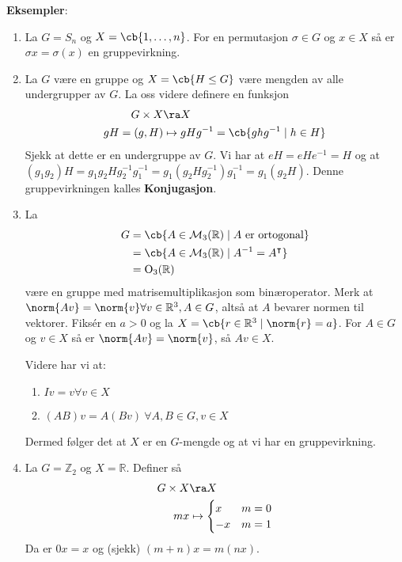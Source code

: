 \textbf{Eksempler}:
\begin{enumerate}
	\item La $G = S_n$ og $X = \cb{1, \dots, n}$. For en permutasjon $\sigma \in G$ og
	      $x\in X$ så er $\sigma x = \sigma(x)$ en gruppevirkning.
	\item La $G$ være en gruppe og $X=\cb{H\leq G}$ være mengden av alle undergrupper av
	      $G$. La oss videre definere en funksjon
	      \begin{align}
		      G\times X   & \ra X                                       \\
		      gH = (g, H) & \mapsto gHg^{-1} = \cb{ghg^{-1}\mid h\in H}
	      \end{align}
	      Sjekk at dette er en undergruppe av $G$. Vi har at $eH = eHe^{-1} = H$ og at
	      $(g_1g_2)H = g_1g_2Hg_2^{-1}g_1^{-1} = g_1(g_2Hg_2^{-1})g_1^{-1} = g_1(g_2H)$.
	      Denne gruppevirkningen kalles \textbf{Konjugasjon}.
	\item La
	      \begin{align}
		      G & = \cb{A\in \mathcal{M}_3(\mathbb{R})\mid A \text{ er ortogonal}} \\
		        & = \cb{A\in \mathcal{M}_3(\mathbb{R})\mid A^{-1} = A^\intercal}   \\
		        & = \text{O}_3(\mathbb{R})
	      \end{align}
	      være en gruppe med matrisemultiplikasjon som binæroperator. Merk at
	      $\norm{Av} = \norm{v} \forall v\in \mathbb{R}^3, A\in G$, altså at
	      $A$ bevarer normen til vektorer. Fiksér en $a > 0$ og la
	      $X = \cb{r\in \mathbb{R}^3\mid \norm{r} = a}$. For $A \in G$ og $v\in X$
	      så er $\norm{Av} = \norm{v}$, så $Av\in X$.

	      Videre har vi at:
	      \begin{enumerate}
		      \item $Iv = v \forall v\in X$
		      \item $(AB)v = A(Bv)\ \forall A, B\in G, v\in X$
	      \end{enumerate}
	      Dermed følger det at $X$ er en $G$-mengde og at vi har en gruppevirkning.
	\item La $G = \mathbb{Z}_2$ og $X = \mathbb{R}$. Definer så
	      \begin{align}
		      G\times X & \ra X                \\
		      mx        & \mapsto \begin{cases}
			                          x  & m = 0 \\
			                          -x & m = 1
		                          \end{cases}
	      \end{align}
	      Da er $0x = x$ og (sjekk) $(m + n)x = m(nx)$.
\end{enumerate}

